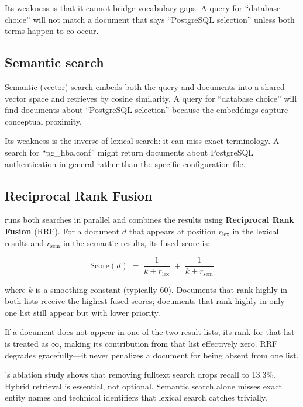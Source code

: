 Its weakness is that it cannot bridge vocabulary gaps. A query for
``database choice'' will not match a document that says ``PostgreSQL
selection'' unless both terms happen to co-occur.

\subsection{Semantic search}

Semantic (vector) search embeds both the query and documents into a shared
vector space and retrieves by cosine similarity. A query for ``database
choice'' will find documents about ``PostgreSQL selection'' because the
embeddings capture conceptual proximity.

Its weakness is the inverse of lexical search: it can miss exact terminology.
A search for ``pg\_hba.conf'' might return documents about PostgreSQL
authentication in general rather than the specific configuration file.

\subsection{Reciprocal Rank Fusion}

\sysname{} runs both searches in parallel and combines the results using
\textbf{Reciprocal Rank Fusion} (RRF). For a document $d$ that appears at
position $r_{\text{lex}}$ in the lexical results and $r_{\text{sem}}$ in the
semantic results, its fused score is:

\[
    \text{Score}(d) \;=\;
    \frac{1}{k + r_{\text{lex}}}
    \;+\;
    \frac{1}{k + r_{\text{sem}}}
\]

\noindent where $k$ is a smoothing constant (typically 60). Documents that rank
highly in both lists receive the highest fused scores; documents that rank
highly in only one list still appear but with lower priority.

\begin{warning}
If a document does not appear in one of the two result lists, its rank for
that list is treated as $\infty$, making its contribution from that list
effectively zero. RRF degrades gracefully---it never penalizes a document for
being absent from one list.
\end{warning}

\begin{keyinsight}
\sysname{}'s ablation study shows that removing fulltext search drops recall
to 13.3\%. Hybrid retrieval is essential, not optional. Semantic search alone
misses exact entity names and technical identifiers that lexical search
catches trivially.
\end{keyinsight}

